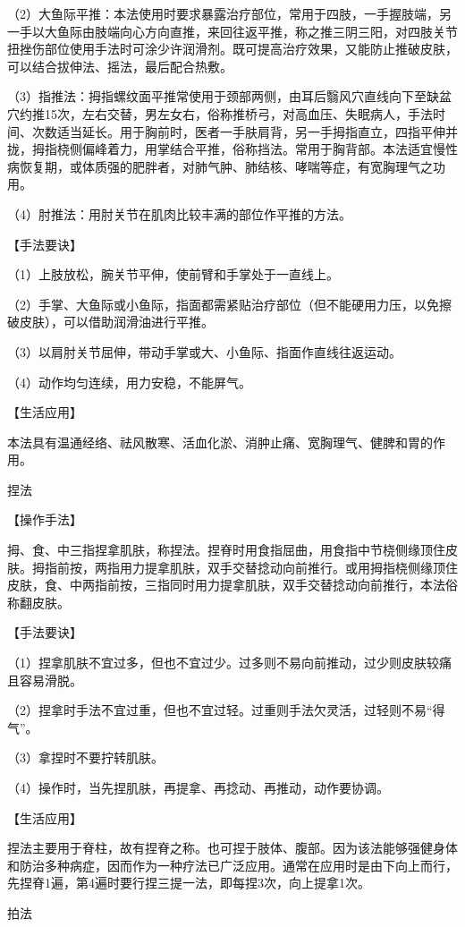 \documentclass[12pt,UTF8,openany]{ctexbook}
\begin{document}
（2）大鱼际平推：本法使用时要求暴露治疗部位，常用于四肢，一手握肢端，另一手以大鱼际由肢端向心方向直推，来回往返平推，称之推三阴三阳，对四肢关节扭挫伤部位使用手法时可涂少许润滑剂。既可提高治疗效果，又能防止推破皮肤，可以结合拔伸法、摇法，最后配合热敷。

（3）指推法：拇指螺纹面平推常使用于颈部两侧，由耳后翳风穴直线向下至缺盆穴约推15次，左右交替，男左女右，俗称推桥弓，对高血压、失眠病人，手法时间、次数适当延长。用于胸前时，医者一手肤肩背，另一手拇指直立，四指平伸并拢，拇指桡侧偏峰着力，用掌结合平推，俗称挡法。常用于胸背部。本法适宜慢性病恢复期，或体质强的肥胖者，对肺气肿、肺结核、哮喘等症，有宽胸理气之功用。

（4）肘推法：用肘关节在肌肉比较丰满的部位作平推的方法。

【手法要诀】

（1）上肢放松，腕关节平伸，使前臂和手掌处于一直线上。

（2）手掌、大鱼际或小鱼际，指面都需紧贴治疗部位（但不能硬用力压，以免擦破皮肤），可以借助润滑油进行平推。

（3）以肩肘关节屈伸，带动手掌或大、小鱼际、指面作直线往返运动。

（4）动作均匀连续，用力安稳，不能屏气。

【生活应用】

本法具有温通经络、祛风散寒、活血化淤、消肿止痛、宽胸理气、健脾和胃的作用。

捏法

【操作手法】

拇、食、中三指捏拿肌肤，称捏法。捏脊时用食指屈曲，用食指中节桡侧缘顶住皮肤。拇指前按，两指用力提拿肌肤，双手交替捻动向前推行。或用拇指桡侧缘顶住皮肤，食、中两指前按，三指同时用力提拿肌肤，双手交替捻动向前推行，本法俗称翻皮肤。

【手法要诀】

（1）捏拿肌肤不宜过多，但也不宜过少。过多则不易向前推动，过少则皮肤较痛且容易滑脱。

（2）捏拿时手法不宜过重，但也不宜过轻。过重则手法欠灵活，过轻则不易“得气”。

（3）拿捏时不要拧转肌肤。

（4）操作时，当先捏肌肤，再提拿、再捻动、再推动，动作要协调。

【生活应用】

捏法主要用于脊柱，故有捏脊之称。也可捏于肢体、腹部。因为该法能够强健身体和防治多种病症，因而作为一种疗法已广泛应用。通常在应用时是由下向上而行，先捏脊1遍，第4遍时要行捏三提一法，即每捏3次，向上提拿1次。

拍法
\end{document}
